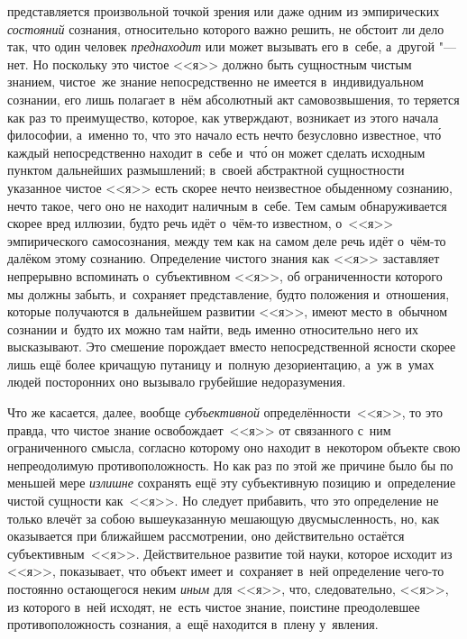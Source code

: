 представляется произвольной точкой зрения или даже одним из эмпирических
{\em состояний} сознания, относительно которого важно решить, не обстоит ли
дело так, что один человек {\em преднаходит} или может вызывать его в~себе,
а~другой "--- нет. Но поскольку это чистое <<я>> должно быть сущностным
чистым знанием, чистое~же знание непосредственно не имеется в~индивидуальном сознании,
его лишь полагает в~нём абсолютный акт самовозвышения, то
теряется как раз то преимущество, которое, как утверждают, возникает из этого
начала философии, а~именно то, что это начало есть нечто безусловно известное,
чт\'{о} каждый непосредственно находит в~себе и~чт\'{о} он может сделать
исходным пунктом дальнейших размышлений; в~своей
абстрактной сущностности указанное чистое <<я>> есть скорее нечто неизвестное обыденному сознанию, нечто такое,
чего оно не находит наличным в~себе. Тем самым обнаруживается скорее вред иллюзии,
будто речь идёт о~чём-то известном, о~<<я>> эмпирического
самосознания, между тем как на самом деле речь идёт о~чём-то далёком этому
сознанию. Определение чистого знания как <<я>> заставляет непрерывно вспоминать
о~субъективном <<я>>, об ограниченности которого мы должны забыть, и~сохраняет
представление, будто положения и~отношения, которые получаются в~дальнейшем
развитии <<я>>, имеют место в~обычном сознании и~будто их можно там найти,
ведь именно относительно него их высказывают. Это смешение
порождает вместо непосредственной ясности скорее лишь ещё более кричащую
путаницу и~полную дезориентацию, а~уж в~умах людей посторонних оно вызывало
грубейшие недоразумения.

Что же касается, далее, вообще {\em субъективной} определённости~<<я>>, то это
правда, что чистое знание освобождает~<<я>> от связанного с~ним ограниченного
смысла, согласно которому оно находит в~некотором объекте свою непреодолимую
противоположность. Но как раз по этой же причине было бы по меньшей мере
{\em излишне} сохранять ещё эту субъективную позицию и~определение чистой
сущности как~<<я>>. Но следует прибавить, что это определение не только влечёт
за собою вышеуказанную мешающую двусмысленность, но, как оказывается при
ближайшем рассмотрении, оно действительно остаётся субъективным~<<я>>.
Действительное развитие той науки, которое исходит из <<я>>, показывает, что
объект имеет и~сохраняет в~ней определение чего-то постоянно остающегося неким
{\em иным} для <<я>>, что, следовательно, <<я>>, из которого в~ней исходят,
не~есть чистое знание, поистине преодолевшее противоположность сознания, а~ещё
находится в~плену у~явления.

